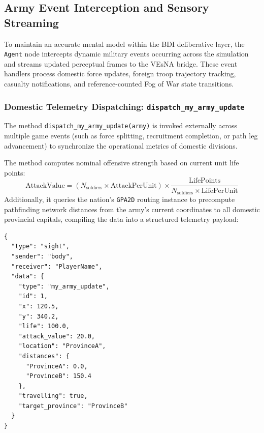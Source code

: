 \subsection{Army Event Interception and Sensory Streaming}
\label{subsec:nation_army_events}

To maintain an accurate mental model within the BDI deliberative layer, the \texttt{Agent} node intercepts dynamic military events occurring across the simulation and streams updated perceptual frames to the VEsNA bridge. These event handlers process domestic force updates, foreign troop trajectory tracking, casualty notifications, and reference-counted Fog of War state transitions.

\subsubsection{Domestic Telemetry Dispatching: \texttt{dispatch\_my\_army\_update}}
The method \texttt{dispatch\_my\_army\_update(army)} is invoked externally across multiple game events (such as force splitting, recruitment completion, or path leg advancement) to synchronize the operational metrics of domestic divisions. 

The method computes nominal offensive strength based on current unit life points:
\begin{equation}
    \text{AttackValue} = (N_{\text{soldiers}} \times \text{AttackPerUnit}) \times \frac{\text{LifePoints}}{N_{\text{soldiers}} \times \text{LifePerUnit}}
\end{equation}
Additionally, it queries the nation's \texttt{GPA2D} routing instance to precompute pathfinding network distances from the army's current coordinates to all domestic provincial capitals, compiling the data into a structured telemetry payload:

\begin{lstlisting}[caption={Structure of the domestic army telemetry JSON packet dispatched to VEsNA.}, label={lst:my_army_update_json}]
{
  "type": "sight",
  "sender": "body",
  "receiver": "PlayerName",
  "data": {
    "type": "my_army_update",
    "id": 1,
    "x": 120.5,
    "y": 340.2,
    "life": 100.0,
    "attack_value": 20.0,
    "location": "ProvinceA",
    "distances": {
      "ProvinceA": 0.0,
      "ProvinceB": 150.4
    },
    "travelling": true,
    "target_province": "ProvinceB"
  }
}
\end{lstlisting}

